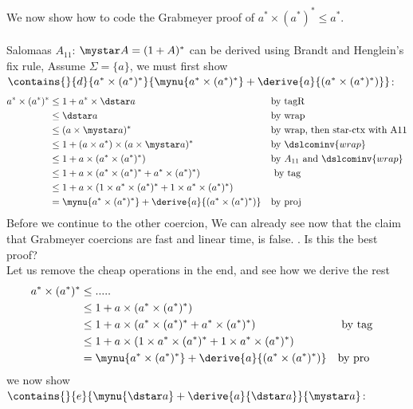We now show how to code the Grabmeyer proof of $a^* \times (a^*)^*   \leq a^*$.\\\\
Salomaas $A_{11}$: $\mystar A = (1 + A)^*$ can be derived using Brandt and Henglein's fix rule, 
Assume $\Sigma = \{a \}$, we must first show $\contains{}{d}{a^* \times (a^*)^* }{\mynu{a^* \times (a^*)^*} + \derive{a}{(a^* \times (a^*)^*)}}$:
\begin{align}
 a^* \times (a^*)^* &\leq 1 + a^* \times \dstar a  &&\text{by tagR}\\
                    &\leq \dstar a  &&\text{by wrap} \\
                    &\leq (a \times \mystar a)^* &&\text{by wrap, then star-ctx with A11} \\
                    &\leq 1 + (a \times a^*) \times ( a \times \mystar a)^* && \text{by } \dslcominv{wrap} \\
                   &\leq 1 + a \times (a^* \times (a^*)^* ) &&\text{by }A_{11} \text{ and } \dslcominv{wrap}\\
                   &\leq 1 + a \times (a^* \times (a^*)^* + a^* \times (a^*)^* ) &&\text{ by tag}\\
                   &\leq 1 + a \times (1 \times a^* \times (a^*)^* + 1 \times a^* \times (a^*)^* )\\
                   &=  \mynu{a^* \times (a^*)^*} + \derive{a}{(a^* \times (a^*)^*)} &&\text{by proj}
\end{align}
Before we continue to the other coercion, We can already see now that the claim that Grabmeyer coercions are fast and linear time, is false. . Is this the best proof?\\
Let us remove the cheap operations in the end, and see how we derive the rest
\begin{align}
 a^* \times (a^*)^* & \leq .....\\
                   &\leq 1 + a \times (a^* \times (a^*)^* )\\
                   &\leq 1 + a \times (a^* \times (a^*)^* + a^* \times (a^*)^* ) &&\text{ by tag}\\
                   &\leq 1 + a \times (1 \times a^* \times (a^*)^* + 1 \times a^* \times (a^*)^* )\\
                   &=  \mynu{a^* \times (a^*)^*} + \derive{a}{(a^* \times (a^*)^*)} &&\text{by pro}
\end{align}
\newpage
we now show $\contains{}{e}{\mynu{\dstar a} + \derive{a}{\dstar a}}{\mystar a}$:
